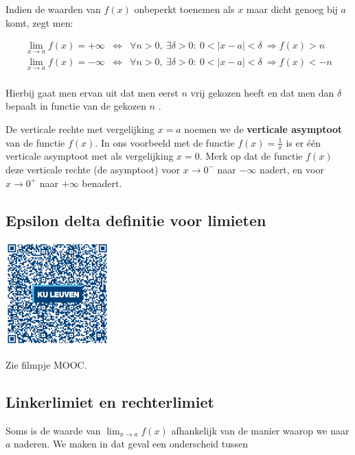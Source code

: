 Indien de waarden van $f(x)$ onbeperkt toenemen als $x$ maar dicht
genoeg bij $a$ komt, zegt men:

\begin{eqnarray*}
{\displaystyle \lim_{x\to a}}f(x)=+\infty & \Leftrightarrow & \forall n>0,\:\exists\delta>0:\:0<\left|x-a\right|<\delta\:\Rightarrow f(x)>n\\
{\displaystyle \lim_{x\to a}}f(x)=-\infty & \Leftrightarrow & \forall n>0,\:\exists\delta>0:\:0<\left|x-a\right|<\delta\:\Rightarrow f(x)<-n\\
\end{eqnarray*}

Hierbij gaat men ervan uit dat men eerst $n$ vrij gekozen heeft en
dat men dan $\delta$ bepaalt in functie van de gekozen $n$ .

De verticale rechte met vergelijking $x=a$ noemen we de \textbf{verticale
asymptoot} van de functie $f(x)$. In ons voorbeeld met de functie
$f(x)={\displaystyle \frac{1}{x}}$ is er \'e\'en verticale asymptoot
met als vergelijking $x=0$. Merk op dat de functie $f(x)$ deze verticale
rechte (de asymptoot) voor $x\rightarrow0^{-}$ naar $-\infty$ nadert,
en voor $x\rightarrow0^{+}$ naar $+\infty$ benadert.

\subsection{Epsilon delta definitie voor limieten}
\begin{minipage}{.25\linewidth}
	\raggedright
	\includegraphics[width=4cm]{2_elem_rekenvaardigheden_B/inputs/QR_Code_EPSILONDELTA_module2new}
\end{minipage}
\begin{minipage}{.7\linewidth}
	Zie filmpje MOOC.
\end{minipage}

\subsection{Linkerlimiet en rechterlimiet}

Soms is de waarde van $\lim_{x\to a}f(x)$ afhankelijk
van de manier waarop we naar $a$ naderen. We maken in dat geval een
onderscheid tussen


